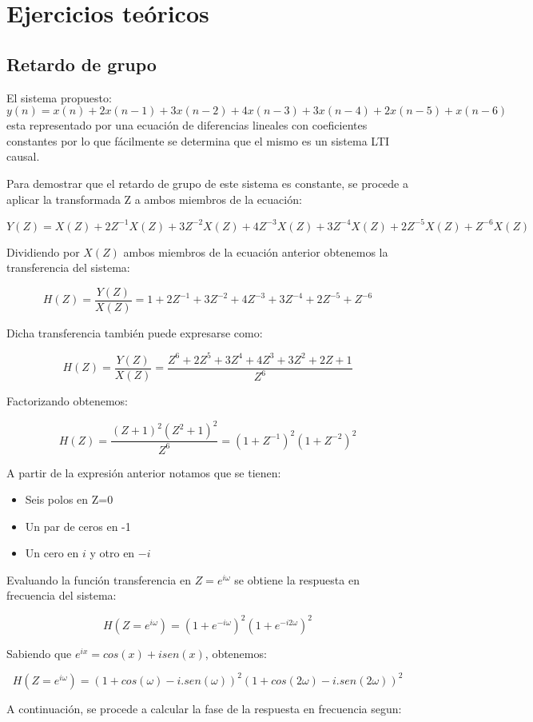 \documentclass[../../ASSD_TP1_G7.tex]{subfiles}
\begin{document}
\chapter*{Ejercicios te\'oricos}

\section{Retardo de grupo}
El sistema propuesto: $y(n)=x(n)+2x(n-1)+3x(n-2)+4x(n-3)+3x(n-4)+2x(n-5)+x(n-6)$  esta representado por una ecuaci\'{o}n de diferencias lineales con coeficientes constantes por lo que fácilmente se determina que el mismo es un sistema LTI causal. 

  
Para demostrar que el retardo de grupo de este sistema es constante, se procede a aplicar la transformada Z a ambos miembros de la ecuación: 

\[Y(Z)=X(Z)+2Z^{-1} X(Z)+3Z^{-2}X(Z)+4Z^{-3}X(Z)+3Z^{-4}X(Z)+2Z^{-5}X(Z)+Z^{-6}X(Z)\] 

Dividiendo por $X(Z)$ ambos miembros de la ecuación anterior obtenemos la transferencia del sistema:

\[H(Z)=\frac{Y(Z)}{X(Z)}=1+2Z^{-1}+3Z^{-2}+4Z^{-3}+3Z^{-4}+2Z^{-5}+Z^{-6}\] 

Dicha transferencia también puede expresarse como:

\[H(Z)=\frac{Y(Z)}{X(Z)}=\frac{Z^{6}+2Z^{5}+3Z^{4}+4Z^{3}+3Z^{2}+2Z+1}{Z^6}\] 

Factorizando obtenemos:

\[H(Z)=\frac{(Z+1)^2(Z^2+1)^2}{Z^6}=(1+Z^{-1})^2(1+Z^{-2})^2\] 

A partir de la expresión anterior notamos que se tienen:
\begin{itemize}
\item Seis polos en Z=0
\item Un par de ceros en -1 
\item Un cero en $i$ y otro en $-i$
\end{itemize}

Evaluando la función transferencia en $Z=e^{i\omega}$ se obtiene la respuesta en frecuencia del sistema: 

\[H(Z=e^{i\omega})=(1+e^{-i\omega})^2(1+e^{-i2\omega})^2\] 

Sabiendo que $e^{ix}=cos(x)+isen(x)$, obtenemos:

\[H(Z=e^{i\omega})=(1+cos(\omega)-i.sen(\omega))^2(1+cos(2\omega)-i.sen(2\omega))^2\] 

A continuación, se procede a calcular la fase de la respuesta en frecuencia segun:
\end{document}
